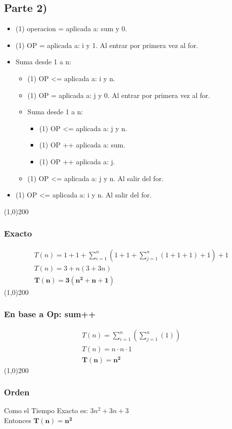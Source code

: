 \subsection*{Parte 2)}
\begin{itemize}
  \item (1) operacion = aplicada a: sum y 0.
  \item (1) OP = aplicada a: i y 1. Al entrar por primera vez al for.
  \item Suma desde 1 a n:
  \begin{itemize}
    \item (1) OP <= aplicada a: i y n.
    \item (1) OP = aplicada a: j y 0. Al entrar por primera vez al for.
    \item Suma desde 1 a n:
      \begin{itemize}
        \item (1) OP <= aplicada a: j y n.
        \item (1) OP ++ aplicada a: sum.
        \item (1) OP ++ aplicada a: j.
      \end{itemize}
    \item (1) OP <= aplicada a: j y n. Al salir del for.
  \end{itemize}
\item (1) OP <= aplicada a: i y n. Al salir del for.
\end{itemize}
\line(1,0){200}
\subsubsection*{Exacto}
\begin{align*}
&T(n) = 1+1+\sum_{i=1}^{n}\left(1+1+\sum_{j=1}^{n}{(1+1+1)}+1\right) + 1\\
&T(n) = 3 + n(3 + 3n)\\ 
&\mathbf{T(n) = 3(n^2+n+1)}
\end{align*}
\line(1,0){200}
\subsubsection*{En base a Op: sum++}
\begin{align*}
&T(n) = \sum_{i=1}^{n}\left(\sum_{j=1}^{n}(1)\right)\\
&T(n) = n \cdot n \cdot 1\\
&\mathbf{T(n) = n^2}
\end{align*}
\line(1,0){200}
\subsubsection*{Orden}
Como el Tiempo Exacto es: $\displaystyle 3n^2 + 3n + 3$\\
Entonces $\mathbf{T(n) = n^2}$
\pagebreak

